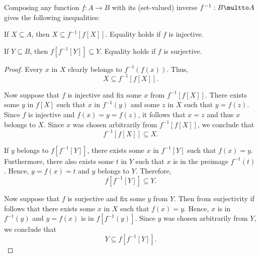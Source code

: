 \begin{proposition}\label{thm:function_image_preimage_composition}
  Composing any function \( f: A \to B \) with its (set-valued) inverse \( f^{-1}: B \multto A \) gives the following inequalities:
  \begin{thmenum}
     If \( X \subseteq A \), then \( X \subseteq f^{-1}[f[X]] \). Equality holds if \( f \) is injective.

     If \( Y \subseteq B \), then \( f[f^{-1}[Y]] \subseteq Y \). Equality holds if \( f \) is surjective.
  \end{thmenum}
\end{proposition}
\begin{proof}
   Every \( x \) in \( X \) clearly belongs to \( f^{-1}(f(x)) \). Thus,
  \begin{equation*}
    X \subseteq f^{-1}[f[X]].
  \end{equation*}

  Now suppose that \( f \) is injective and fix some \( x \) from \( f^{-1}[f[X]] \). There exists some \( y \) in \( f[X] \) such that \( x \) in \( f^{-1}(y) \) and some \( z \) in \( X \) such that \( y = f(z) \). Since \( f \) is injective and \( f(x) = y = f(z) \), it follows that \( x = z \) and thus \( x \) belongs to \( X \). Since \( x \) was chosen arbitrarily from \( f^{-1}[f[X]] \), we conclude that
  \begin{equation*}
    f^{-1}[f[X]] \subseteq X.
  \end{equation*}

   If \( y \) belongs to \( f[f^{-1}[Y]] \), there exists some \( x \) in \( f^{-1}[Y] \) such that \( f(x) = y \). Furthermore, there also exists some \( t \) in \( Y \) such that \( x \) is in the preimage \( f^{-1}(t) \). Hence, \( y = f(x) = t \) and \( y \) belongs to \( Y \). Therefore,
  \begin{equation*}
    f[f^{-1}[Y]] \subseteq Y.
  \end{equation*}

  Now suppose that \( f \) is surjective and fix some \( y \) from \( Y \). Then from surjectivity if follows that there exists some \( x \) in \( X \) such that \( f(x) = y \). Hence, \( x \) is in \( f^{-1}(y) \) and \( y = f(x) \) is in \( f[f^{-1}(y)] \). Since \( y \) was chosen arbitrarily from \( Y \), we conclude that
  \begin{equation*}
    Y \subseteq f[f^{-1}[Y]].
  \end{equation*}
\end{proof}

